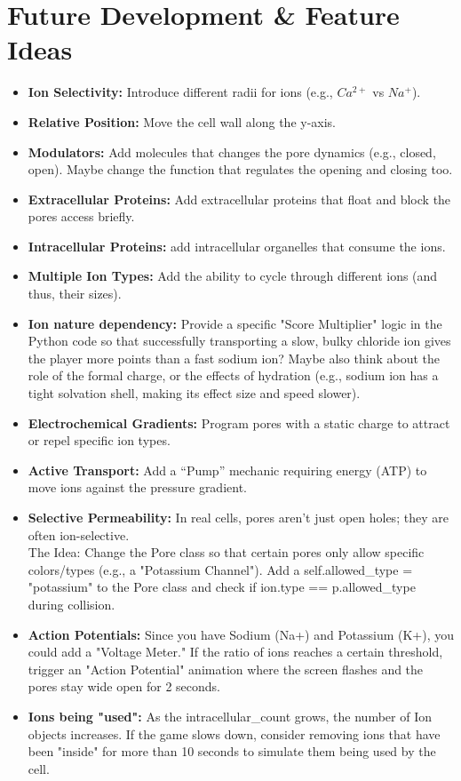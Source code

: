 \documentclass[11pt]{article}
\begin{document}
\section{Future Development \& Feature Ideas}
\begin{itemize}
    \item \textbf{Ion Selectivity:} Introduce different radii for ions (e.g., $Ca^{2+}$ vs $Na^+$).
    \item \textbf{Relative Position:} Move the cell wall along the y-axis.
    \item \textbf{Modulators:} Add molecules that changes the pore dynamics (e.g., closed, open). Maybe change the function that regulates the opening and closing too.
    \item \textbf{Extracellular Proteins:} Add extracellular proteins that float and block the pores access briefly.
    \item \textbf{Intracellular Proteins:} add intracellular organelles that consume the ions.
    \item \textbf{Multiple Ion Types:} Add the ability to cycle through different ions (and thus, their sizes).
    \item \textbf{Ion nature dependency:} Provide a specific "Score Multiplier" logic in the Python code so that successfully transporting a slow, bulky chloride ion gives the player more points than a fast sodium ion? Maybe also think about the role of the formal charge, or the effects of hydration (e.g., sodium ion has a tight solvation shell, making its effect size and speed slower).
    \item \textbf{Electrochemical Gradients:} Program pores with a static charge to attract or repel specific ion types.
    \item \textbf{Active Transport:} Add a ``Pump'' mechanic requiring energy (ATP) to move ions against the pressure gradient.
    \item \textbf{Selective Permeability:} In real cells, pores aren't just open holes; they are often ion-selective.\\
    The Idea: Change the Pore class so that certain pores only allow specific colors/types (e.g., a "Potassium Channel"). Add a self.allowed\_type = "potassium" to the Pore class and check if ion.type == p.allowed\_type during collision.
	\item \textbf{Action Potentials:} Since you have Sodium (Na+) and Potassium (K+), you could add a "Voltage Meter." If the ratio of ions reaches a certain threshold, trigger an "Action Potential" animation where the screen flashes and the pores stay wide open for 2 seconds.
	\item \textbf{Ions being "used":} As the intracellular\_count grows, the number of Ion objects increases. If the game slows down, consider removing ions that have been "inside" for more than 10 seconds to simulate them being used by the cell.
\end{itemize}
\end{document}
